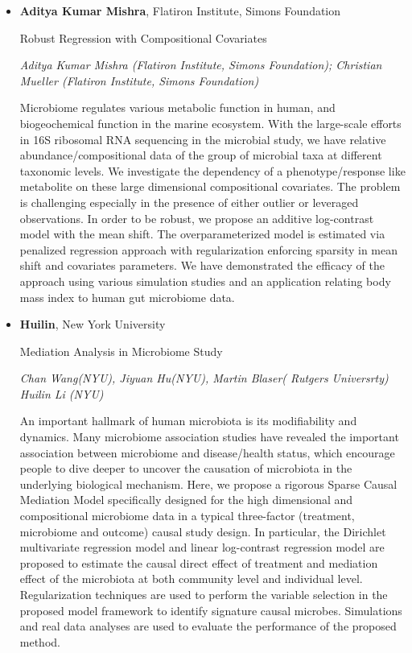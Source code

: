 \begin{itemize}
\item \textbf{Aditya Kumar Mishra}, Flatiron Institute, Simons Foundation

Robust Regression with Compositional Covariates

\emph{\footnotesize Aditya Kumar Mishra (Flatiron Institute, Simons Foundation); Christian Mueller (Flatiron Institute, Simons Foundation)}

Microbiome regulates various metabolic function in human, and biogeochemical function in the marine ecosystem. With the large-scale efforts in 16S ribosomal RNA sequencing in the microbial study, we have relative abundance/compositional data of the group of microbial taxa at different taxonomic levels.  We investigate the dependency of a phenotype/response like metabolite on these large dimensional compositional covariates. The problem is challenging especially in the presence of either outlier or leveraged observations. In order to be robust, we propose an additive log-contrast model with the mean shift. The overparameterized model is estimated via penalized regression approach with regularization enforcing sparsity in mean shift and covariates parameters. We have demonstrated the efficacy of the approach using various simulation studies and an application relating body mass index to human gut microbiome data.


\item \textbf{Huilin}, New York University

Mediation Analysis in Microbiome Study

\emph{\footnotesize Chan Wang(NYU), Jiyuan Hu(NYU), Martin Blaser( Rutgers Universrty) Huilin Li (NYU)}

An important hallmark of human microbiota is its modifiability and dynamics. Many microbiome association studies have revealed the important association between microbiome and disease/health status, which encourage people to dive deeper to uncover the causation of microbiota in the underlying biological mechanism. Here, we propose a rigorous Sparse Causal Mediation Model specifically designed for the high dimensional and compositional microbiome data in a typical three-factor (treatment, microbiome and outcome) causal study design. In particular, the Dirichlet multivariate regression model and linear log-contrast regression model are proposed to estimate the causal direct effect of treatment and mediation effect of the microbiota at both community level and individual level. Regularization techniques are used to perform the variable selection in the proposed model framework to identify signature causal microbes. Simulations and real data analyses are used to evaluate the performance of the proposed method.


\end{itemize}
